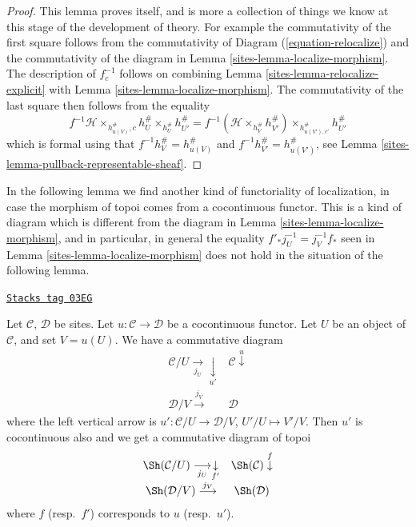 \begin{proof}

This lemma proves itself, and is more a collection of things we know
at this stage of the development of theory. For example the commutativity
of the first square follows from the commutativity of
Diagram (\ref{equation-relocalize})
and the commutativity of the diagram in
Lemma \ref{sites-lemma-localize-morphism}.
The description of $f_c^{-1}$ follows on combining
Lemma \ref{sites-lemma-relocalize-explicit}
with
Lemma \ref{sites-lemma-localize-morphism}.
The commutativity of the last square then follows from the
equality
$$
f^{-1}\mathcal{H} \times_{h_{u(V)}^\#, c} h_U^\# \times_{h_U^\#} h_{U'}^\#
=
f^{-1}(\mathcal{H} \times_{h_V^\#} h_{V'}^\#)
\times_{h_{u(V'), c'}^\#} h_{U'}^\#
$$
which is formal using that $f^{-1}h_V^\# = h_{u(V)}^\#$ and
$f^{-1}h_{V'}^\# = h_{u(V')}^\#$, see
Lemma \ref{sites-lemma-pullback-representable-sheaf}.
\end{proof}

In the following lemma we find another kind of functoriality of
localization, in case the morphism of topoi comes from a
cocontinuous functor. This is a kind of diagram which is different
from the diagram in
Lemma \ref{sites-lemma-localize-morphism},
and in particular, in general the equality $f'_*j_U^{-1} = j_V^{-1}f_*$ seen in
Lemma \ref{sites-lemma-localize-morphism}
does not hold in the situation of the following lemma.

\begin{lemma}
\label{sites-lemma-localize-cocontinuous}
\href{https://stacks.math.columbia.edu/tag/03EG}{\texttt{Stacks tag 03EG}}

Let $\mathcal{C}$, $\mathcal{D}$ be sites.
Let $u : \mathcal{C} \to \mathcal{D}$ be a cocontinuous functor.
Let $U$ be an object of $\mathcal{C}$, and set $V = u(U)$.
We have a commutative diagram
$$
\begin{array}{cc}\mathcal{C}/U \underset{j_U}{\longrightarrow}\underset{u'}{\downarrow} & \mathcal{C} \overset{u}{\downarrow} \\ \mathcal{D}/V \overset{j_V}{\longrightarrow} & \mathcal{D}\end{array}
$$
where the left vertical arrow is
$u' : \mathcal{C}/U \to \mathcal{D}/V$, $U'/U \mapsto V'/V$.
Then $u'$ is cocontinuous also and we get a commutative diagram of topoi
$$
\begin{array}{cc}\Sh(\mathcal{C}/U) \underset{j_U}{\longrightarrow}\underset{f'}{\downarrow} & \Sh(\mathcal{C}) \overset{f}{\downarrow} \\ \Sh(\mathcal{D}/V) \overset{j_V}{\longrightarrow} & \Sh(\mathcal{D})\end{array}
$$
where $f$ (resp.\ $f'$) corresponds to $u$ (resp.\ $u'$).
\end{lemma}

